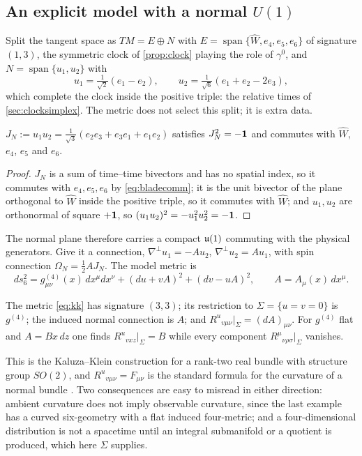 \subsection{An explicit model with a normal $U(1)$}
\label{sec:curvedmodel}

Split the tangent space as $TM=E\oplus N$ with $E=\operatorname{span}\{\widehat W,e_4,e_5,e_6\}$ of signature $(1,3)$, the symmetric clock of
\cref{prop:clock} playing the role of $\gamma^0$, and $N=\operatorname{span}\{u_1,u_2\}$ with
\[
u_1=\tfrac1{\sqrt2}(e_1-e_2),\qquad u_2=\tfrac1{\sqrt6}(e_1+e_2-2e_3),
\]
which complete the clock inside the positive triple: the relative times of \cref{sec:clocksimplex}. The metric does not select this split; it is extra
data.

\begin{lemma}
\label{lem:JN}
$J_N:=u_1u_2=\tfrac1{\sqrt3}(e_2e_3+e_3e_1+e_1e_2)$ satisfies $J_N^2=-\mathbf 1$ and commutes with $\widehat W$, $e_4$, $e_5$ and $e_6$.
\end{lemma}

\begin{proof}
$J_N$ is a sum of time--time bivectors and has no spatial index, so it commutes with $e_4,e_5,e_6$ by \eqref{eq:bladecomm}; it is the unit bivector of
the plane orthogonal to $\widehat W$ inside the positive triple, so it commutes with $\widehat W$; and $u_1,u_2$ are orthonormal of square $+\mathbf 1$, so
$(u_1u_2)^2=-u_1^2u_2^2=-\mathbf 1$.
\end{proof}

The normal plane therefore carries a compact $\mathfrak{u}(1)$ commuting with the physical generators. Give it a connection, $\nabla^\perp u_1=-Au_2$,
$\nabla^\perp u_2=Au_1$, with spin connection $\Omega_N=\tfrac12AJ_N$. The model metric is
\begin{equation}
\label{eq:kk}
ds_6^2=g^{(4)}_{\mu\nu}(x)\,dx^\mu dx^\nu+(du+vA)^2+(dv-uA)^2,\qquad A=A_\mu(x)\,dx^\mu .
\end{equation}

\begin{proposition}
\label{prop:kk}
The metric \eqref{eq:kk} has signature $(3,3)$; its restriction to $\Sigma=\{u=v=0\}$ is $g^{(4)}$; the induced normal connection is $A$; and
$R^u{}_{v\mu\nu}|_\Sigma=(dA)_{\mu\nu}$. For $g^{(4)}$ flat and $A=Bx\,dz$ one finds $R^u{}_{vxz}|_\Sigma=B$ while every component $R^\mu{}_{\nu\rho\sigma}|_\Sigma$
vanishes.
\end{proposition}

This is the Kaluza--Klein construction for a rank-two real bundle with structure group $SO(2)$, and $R^u{}_{v\mu\nu}=F_{\mu\nu}$ is the standard formula for
the curvature of a normal bundle \cite{AppelquistChodosFreund87,ONeill83}. Two consequences are easy to misread in either direction: ambient curvature does
not imply observable curvature, since the last example has a curved six-geometry with a flat induced four-metric; and a four-dimensional distribution is not
a spacetime until an integral submanifold or a quotient is produced, which here $\Sigma$ supplies.

